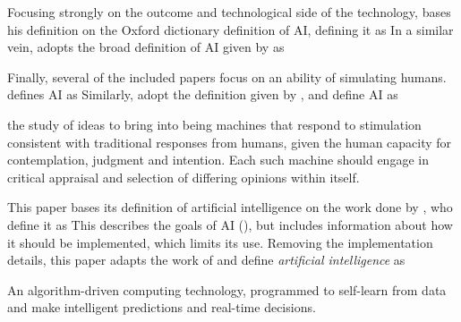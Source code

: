 Focusing strongly on the outcome and technological side of the technology, \textcite[p. 130-131]{Brand_2022} bases his definition on the Oxford dictionary definition of AI, defining it as  In a similar vein, \textcite[p. 1]{Havrda_2020} adopts the broad definition of AI given by \textcite{IEEE_vision} as 

Finally, several of the included papers focus on an ability of simulating humans. \textcite[p. 3-4]{Liu_2021} defines AI as  Similarly, \textcite[p. 3]{vanBruxvoort_2021} adopt the definition given by \textcite{Shubhendu_2013}, and define AI as
\begin{displayquote}
    the study of ideas to bring into being machines that respond to stimulation consistent with traditional responses from humans, given the human capacity for contemplation, judgment and intention. Each such machine should engage in critical appraisal and selection of differing opinions within itself.
\end{displayquote}

This paper bases its definition of artificial intelligence on the work done by \textcite[p.~1]{Siala_2022}, who define it as  This describes the goals of AI (), but includes information about how it should be implemented, which limits its use. Removing the implementation details, this paper adapts the work of \textcite{Siala_2022} and define \textit{artificial intelligence} as
\begin{displayquote}
    An algorithm-driven computing technology, programmed to self-learn from data and make intelligent predictions and real-time decisions.
\end{displayquote}


